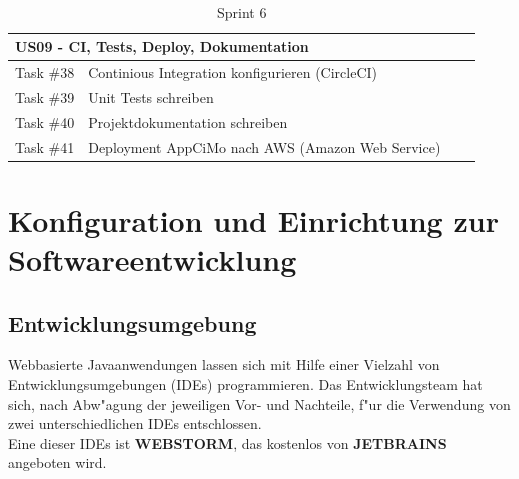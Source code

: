 \documentclass[a4paper, 11pt]{scrreprt}
\begin{document}
\begin{table}[H]

\caption{Sprint 6}

\ \\

\par

\label{tab:Sprint 6}

\centering

\begin{tabular}{|p{2.5cm} p{12cm}| ll}

\hline
\multicolumn{2}{|l|}{US09 - CI, Tests, Deploy, Dokumentation} \\

\hline
Task \#38 & Continious Integration konfigurieren (CircleCI)\\

\hline
Task \#39 & Unit Tests schreiben\\

\hline
Task \#40 & Projektdokumentation schreiben\\

\hline
Task \#41 & Deployment AppCiMo nach AWS (Amazon Web Service)\\

\hline
\end{tabular}

\end{table}

\section{Konfiguration und Einrichtung zur Softwareentwicklung}

\subsection{Entwicklungsumgebung}
Webbasierte Javaanwendungen lassen sich mit Hilfe einer Vielzahl von Entwicklungsumgebungen (IDEs) programmieren.
Das Entwicklungsteam hat sich, nach Abw"agung der jeweiligen Vor- und Nachteile, f"ur die Verwendung von zwei unterschiedlichen IDEs entschlossen.\\

Eine dieser IDEs ist \textbf{WEBSTORM}, das kostenlos von \textbf{JETBRAINS} angeboten wird. \\
\end{document}
